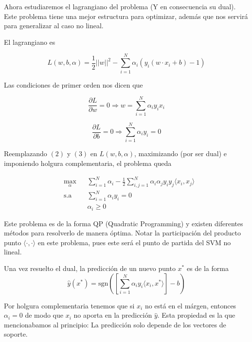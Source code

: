 Ahora estudiaremos el lagrangiano del problema (Y en consecuencia su dual). Este problema tiene una mejor estructura para optimizar, además que nos servirá para generalizar al caso no lineal. 

El lagrangiano es

\begin{equation*}
    L(w,b,\alpha) = \frac{1}{2}||w||^2 - \sum\limits_{i=1}^{N} \alpha_i (y_i (w\cdot x_i +b) -1)
\end{equation*}

Las condiciones de primer orden nos dicen que

\begin{equation}
    \dfrac{\partial L}{\partial w} = 0 \Rightarrow w = \sum\limits_{i=1}^{N} \alpha_i y_i x_i
\end{equation}

\begin{equation}
    \dfrac{\partial L}{\partial b} = 0 \Rightarrow \sum\limits_{i=1}^{N} \alpha_i y_i = 0 
\end{equation}


Reemplazando $(2)$ y $(3)$ en $L(w,b, \alpha)$, maximizando (por ser dual) e imponiendo holgura complementaria, el problema queda

\begin{equation*}
\begin{aligned}
& \underset{\alpha}{\text{max}}
& & \sum\limits_{i=1}^{N}\alpha_i - \frac{1}{2} \sum\limits_{i,j=1}^{N} \alpha_i \alpha_j y_i y_j \langle x_i, x_j\rangle\\
& \text{s.a}
& & \sum\limits_{i=1}^{N} \alpha_i y_i= 0 \\
& &  &\alpha_i \geq 0
\end{aligned}
\end{equation*}

Este problema es de la forma QP (Quadratic Programming) y existen diferentes métodos para resolverlo de manera óptima. 
Notar la participación del producto punto $\langle\cdot, \cdot\rangle$ en este problema, pues este será el punto de partida del SVM no lineal. 

Una vez resuelto el dual, la predicción de un nuevo punto $x^*$ es de la forma $$\hat{y}(x^*)= \text{sgn}\left(\left[\sum\limits_{i=1}^{N} \alpha_i y_i \langle x_i, x^*\rangle\right] - b\right)$$

Por holgura complementaria tenemos que si $x_i$ no está en el márgen, entonces $\alpha_i = 0$ de modo que $x_i$ no aporta en la predicción $\hat{y}$. Esta propiedad es la que mencionabamos al principio: La predicción solo depende de los vectores de soporte. 

